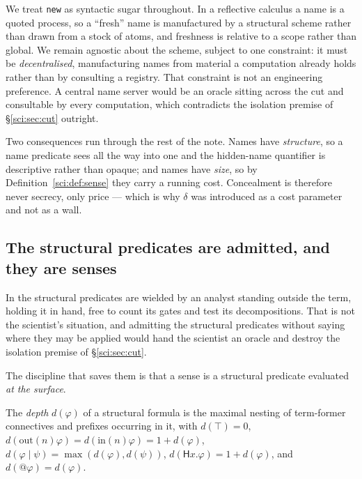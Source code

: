 \begin{remark}
\label{sci:rem:sugar}
We treat \texttt{new} as syntactic sugar throughout. In a reflective calculus a name is a quoted
process, so a ``fresh'' name is manufactured by a structural scheme rather than drawn from a stock of
atoms, and freshness is relative to a scope rather than global. We remain agnostic about the scheme,
subject to one constraint: it must be \emph{decentralised}, manufacturing names from material a
computation already holds rather than by consulting a registry. That constraint is not an engineering
preference. A central name server would be an oracle sitting across the cut and consultable by every
computation, which contradicts the isolation premise of \S\ref{sci:sec:cut} outright.

Two consequences run through the rest of the note. Names have \emph{structure}, so a name predicate
sees all the way into one and the hidden-name quantifier is descriptive rather than opaque; and names
have \emph{size}, so by Definition~\ref{sci:def:sense} they carry a running cost. Concealment is therefore
never secrecy, only price --- which is why $\delta$ was introduced as a cost parameter and not as a
wall.
\end{remark}

\subsection{The structural predicates are admitted, and they are senses}\label{sci:S3.2}

In \cite{ClassifierNote} the structural predicates are wielded by an analyst standing outside the
term, holding it in hand, free to count its gates and test its decompositions. That is not the
scientist's situation, and admitting the structural predicates without saying where they may be
applied would hand the scientist an oracle and destroy the isolation premise of \S\ref{sci:sec:cut}.

The discipline that saves them is that a sense is a structural predicate evaluated \emph{at the
surface}.

\begin{definition}[Depth]\label{sci:depth}
The \emph{depth} $d(\varphi)$ of a structural formula is the maximal nesting of term-former
connectives and prefixes occurring in it, with $d(\top) = 0$, $d(\mathrm{out}(n)\varphi) =
d(\mathrm{in}(n)\varphi) = 1 + d(\varphi)$, $d(\varphi \mid \psi) = \max(d(\varphi), d(\psi))$,
$d(\mathsf{H}x.\varphi) = 1 + d(\varphi)$, and $d(@\varphi) = d(\varphi)$.
\end{definition}


